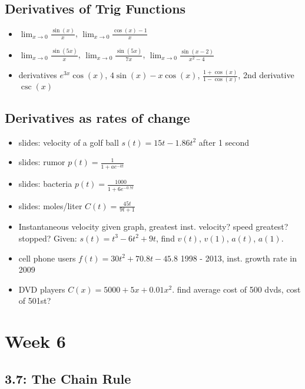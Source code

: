 \documentclass[11pt]{article}
\begin{document}
\subsection{Derivatives of Trig Functions}
\begin{itemize}
	\item $\lim_{x\to0} \frac{\sin(x)}{x}$, $\lim_{x\to 0} \frac{\cos(x) - 1}{x}$
	\item $\lim_{x \to 0} \frac{\sin(5x)}{x}$, $\lim_{x \to 0} \frac{\sin(5x)}{7x}$, $\lim_{x \to 0} \frac{\sin(x-2)}{x^2 - 4}$
	\item derivatives $e^{3x}\cos(x)$, $4\sin(x) - x\cos(x)$, $\frac{1+\cos(x)}{1-\cos(x)}$, 2nd derivative $\csc(x)$
\end{itemize}


\subsection{Derivatives as rates of change}
\begin{itemize}
	\item slides: velocity of a golf ball $s(t) = 15t - 1.86t^2$ after 1 second
	\item slides: rumor $p(t) = \frac{1}{1+ae^{-kt}}$
	\item slides: bacteria $p(t) = \frac{1000}{1+6e^{-0.7t}}$
	\item slides: moles/liter $C(t) = \frac{45t}{9t+1}$
	\item Instantaneous velocity given graph, greatest inst. velocity? speed greatest? stopped? Given: $s(t) = t^3 - 6t^2 + 9t$, find $v(t)$, $v(1)$, $a(t)$, $a(1)$.
	\item cell phone users $f(t) = 30t^2 + 70.8t - 45.8$ 1998 - 2013, inst. growth rate in 2009
	\item DVD players $C(x) = 5000 + 5x + 0.01x^2$.  find average cost of 500 dvds, cost of 501st?
\end{itemize}	




\section*{Week 6}

\subsection{3.7: The Chain Rule}
\end{document}
